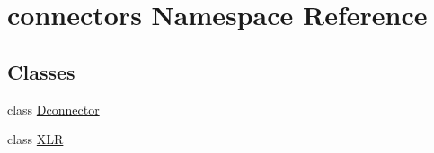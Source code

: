 \hypertarget{namespaceconnectors}{}\section{connectors Namespace Reference}
\label{namespaceconnectors}
\subsection*{Classes}
\begin{DoxyCompactItemize}
\item 
class \hyperlink{classconnectors_1_1_dconnector}{Dconnector}
\item 
class \hyperlink{classconnectors_1_1_x_l_r}{X\+L\+R}
\end{DoxyCompactItemize}
